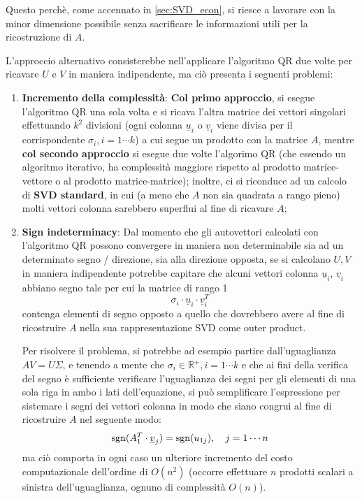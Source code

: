 Questo perchè, come accennato in \ref{sec:SVD_econ}, si riesce a lavorare con la 
minor dimensione possibile senza sacrificare le informazioni utili per la 
ricostruzione di $A$.

L'approccio alternativo consisterebbe nell'applicare l'algoritmo QR due volte 
per ricavare $U$ e $V$ in maniera indipendente, ma ciò presenta i seguenti 
problemi:
\begin{enumerate}
	\item \textbf{Incremento della complessità}: \textbf{Col primo approccio}, si 
esegue l'algoritmo QR una sola volta e si ricava l'altra matrice dei vettori 
singolari effettuando $k^2$ divisioni (ogni colonna $\underline{u}_i$ o 
$\underline{v}_i$ viene divisa per il corrispondente $\sigma_i, i = 1 \cdots k$) 
a cui segue un prodotto con la matrice $A$, mentre \textbf{col secondo 
approccio} si esegue due volte l'algorimo QR (che essendo un algoritmo 
iterativo, ha complessità maggiore rispetto al prodotto matrice-vettore o al 
prodotto matrice-matrice); inoltre, ci si riconduce ad un calcolo di \textbf{SVD 
standard}, in cui (a meno che $A$ non sia quadrata a rango pieno) molti vettori 
colonna sarebbero superflui al fine di ricavare $A$;
	
	\item \textbf{Sign indeterminacy}: Dal momento che gli autovettori calcolati 
con l'algoritmo QR possono convergere in maniera non determinabile sia ad un 
determinato segno / direzione, sia alla direzione opposta, se si calcolano $U,V$ 
in maniera indipendente potrebbe capitare che alcuni vettori colonna 
$\underline{u}_i$, $\underline{v}_i$ abbiano segno tale per cui la matrice di 
rango 1
\begin{equation*}
\sigma_i \cdot \underline{u}_i \cdot \underline{v}_{i}^T
\end{equation*}
contenga elementi di segno opposto a quello che dovrebbero avere al fine di 
ricostruire $A$ nella sua rappresentazione SVD come outer product.

Per risolvere il problema, si potrebbe ad esempio partire dall'uguaglianza $A V 
= U \Sigma$, e tenendo a mente che $\sigma_i \in \mathbb{R}^+, i = 1 \cdots k$ e 
che ai fini della verifica del segno è sufficiente verificare l'uguaglianza dei 
segni per gli elementi di una sola riga in ambo i lati dell'equazione, si può 
semplificare l'espressione per sistemare i segni dei vettori colonna in modo che 
siano congrui al fine di ricostruire $A$ nel seguente modo:
\begin{equation*}
	\operatorname{sgn}(A_{1}^T \cdot \underline{v}_j) = \operatorname{sgn}(u_{1j}), \quad j = 1 \cdots n
\end{equation*}
 ma ciò comporta in ogni caso un ulteriore incremento del costo computazionale 
dell'ordine di $O(n^2)$ (occorre effettuare $n$ prodotti scalari a sinistra 
dell'uguaglianza, ognuno di complessità $O(n)$).
\end{enumerate}

